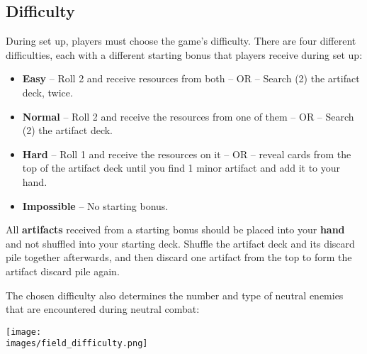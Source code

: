 \subsection*{\hypertarget{Difficulty}{Difficulty}}
During set up, players must choose the game’s difficulty.
There are four different difficulties, each with a different starting bonus that players receive during set up:
\begin{itemize}
  \item \textbf{Easy} – Roll 2  and receive resources from both – OR – Search (2) the artifact deck, twice.
  \item \textbf{Normal} – Roll 2  and receive the resources from one of them – OR – Search (2) the artifact deck.
  \item \textbf{Hard} – Roll 1  and receive the resources on it – OR – reveal cards from the top of the artifact deck until you find 1 minor artifact and add it to your hand.
  \item \textbf{Impossible} – No starting bonus.
\end{itemize}
All \textbf{artifacts} received from a starting bonus should be placed into your \textbf{hand} and not shuffled into your starting deck.
Shuffle the artifact deck and its discard pile together afterwards, and then discard one artifact from the top to form the artifact discard pile again.\par
The chosen difficulty also determines the number and type of neutral enemies that are encountered during neutral combat:
\begin{center}
\texttt{[image: \\images/field\_difficulty.png]}
\end{center}
